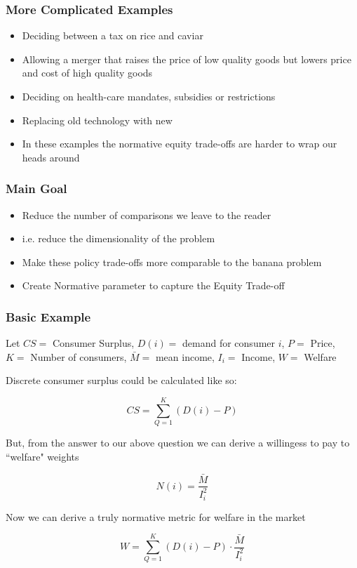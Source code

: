 \documentclass{beamer}
\begin{document}
\begin{frame}
\frametitle{More Complicated Examples}

\begin{itemize}
	\setlength{\itemsep}{5mm}
	\large
	\item Deciding between a tax on rice and caviar 
	\item Allowing a merger that raises the price of low quality goods but lowers price and cost of high quality goods 
	\item Deciding on health-care mandates, subsidies or restrictions 
	\item Replacing old technology with new
	\item In these examples the normative equity trade-offs are harder to wrap our heads around
	
\end{itemize}

\end{frame}


\begin{frame}
\frametitle{Main Goal}

\begin{itemize}
	\setlength{\itemsep}{5mm}
	
\large
		
	\item Reduce the number of comparisons we leave to the reader
	\item i.e. reduce the dimensionality of the problem 
	\item Make these policy trade-offs more comparable to the banana problem 
	\item Create Normative parameter to capture the Equity Trade-off

\end{itemize}

\end{frame}

\begin{frame}
\frametitle{Basic Example}

Let $CS =$ Consumer Surplus, $D(i)=$ demand for consumer $i$, $P =$ Price, $K =$ Number of consumers, $\bar{M} =$ mean income, $I_i =$ Income, $W = $ Welfare   

 Discrete consumer surplus could be calculated like so: 
 
 $$  CS = \sum_{Q = 1}^{K} (D(i) - P) $$
 
 But, from the answer to our above question we can derive a willingess to pay to ``welfare" weights 
 
 $$ N(i) = \frac{\bar{M}}{I_i^2} $$
 
 Now we can derive a truly normative metric for welfare in the market 
 
  $$  W = \sum_{Q = 1}^{K} (D(i) - P) \cdot \frac{\bar{M}}{I_i^2}  $$

 

\end{frame}
\end{document}
